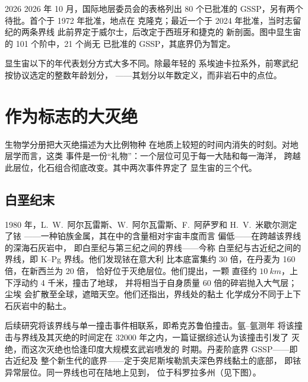 \begin{dated}{2026}
2026 年 10 月，国际地层委员会的表格列出
80 个已批准的 GSSP，另有两个待批。首个于 1972 年批准，地点在
克隆克；最近一个于 2024 年批准，当时志留纪的两条界线
此前界定于威尔士，后改定于西班牙和捷克的
新剖面。图中显生宙的 101 个阶中，21 个尚无
已批准的 GSSP，其底界仍为暂定。
\end{dated}

显生宙以下的年代表划分方式大多不同。除最年轻的
系埃迪卡拉系外，前寒武纪按协议选定的整数年龄划分，
——其划分以年数定义，而非岩石中的点位。

\section{作为标志的大灭绝}\label{sec:b1:stratigraphic-scale:extinctions}

生物学分册把大灭绝描述为大比例物种
在地质上较短的时间内消失的时刻。对地层学而言，这类
事件是一份“礼物”：一个层位可见于每一大陆和每一海洋，
跨越此层位，化石组合彻底改变。其中两次事件界定了
显生宙的三个代。

\subsection*{白垩纪末}

1980 年，L.~W.~阿尔瓦雷斯、W.~阿尔瓦雷斯、F.~阿萨罗和 H.~V.~米歇尔测定了铱
——一种铂族金属，其在中的含量相对宇宙丰度而言
偏低——在跨越该界线的深海石灰岩中，
即白垩纪与第三纪之间的界线——今称
白垩纪与古近纪之间的界线，即 K--Pg 界线。他们发现铱在意大利
比本底富集约 30 倍，在丹麦为 160 倍，在新西兰为 20 倍，
恰好位于灭绝层位。他们提出，一颗
直径约 $\qty{10}{km}$，上下浮动约 4 千米，撞击了地球，
并将相当于自身质量 60 倍的碎岩抛入大气层；尘埃
会扩散至全球，遮暗天空。他们还指出，界线处的黏土
化学成分不同于上下石灰岩中的黏土。

后续研究将该界线与单一撞击事件相联系，即希克苏鲁伯撞击。氩–氩测年
将该撞击与界线及其灭绝的时间定在 \num{32000}
年之内，一篇证据综述认为该撞击引发了
灭绝，而这次灭绝也恰逢印度大规模玄武岩喷发的
时期。丹麦阶底界 GSSP——即古近纪及
整个新生代的底界——定于突尼斯埃勒凯夫深色界线黏土的底部，
即铱异常层位。同一界线也可在陆地上见到，
位于科罗拉多州（见下图）。

